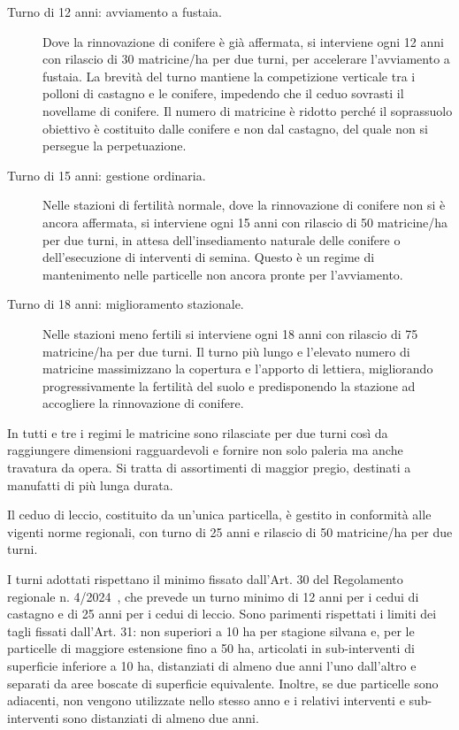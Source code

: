 \begin{description}

\item[Turno di 12 anni: avviamento a fustaia.]

Dove la rinnovazione di conifere è già affermata, si interviene ogni 12 anni con
rilascio di 30 matricine/ha per due turni, per accelerare l'avviamento a
fustaia. La brevità del turno mantiene la competizione verticale tra i polloni
di castagno e le conifere, impedendo che il ceduo sovrasti il novellame di
conifere. Il numero di matricine è ridotto perché il soprassuolo obiettivo è
costituito dalle conifere e non dal castagno, del quale non si persegue la
perpetuazione.

\item[Turno di 15 anni: gestione ordinaria.]

Nelle stazioni di fertilità normale, dove la rinnovazione di conifere non si è
ancora affermata, si interviene ogni 15 anni con rilascio di 50 matricine/ha per
due turni, in attesa dell'insediamento naturale delle conifere o dell'esecuzione
di interventi di semina. Questo è un regime di mantenimento nelle particelle non
ancora pronte per l'avviamento.

\item[Turno di 18 anni: miglioramento stazionale.]

Nelle stazioni meno fertili si interviene ogni 18 anni con rilascio di 75
matricine/ha per due turni. Il turno più lungo e l'elevato numero di matricine
massimizzano la copertura e l'apporto di lettiera, migliorando progressivamente
la fertilità del suolo e predisponendo la stazione ad accogliere la rinnovazione
di conifere.

\end{description}

In tutti e tre i regimi le matricine sono rilasciate per due turni così da
raggiungere dimensioni ragguardevoli e fornire non solo paleria ma anche
travatura da opera. Si tratta di assortimenti di maggior pregio, destinati a
manufatti di più lunga durata.

Il ceduo di leccio, costituito da un'unica particella, è gestito in conformità
alle vigenti norme regionali, con turno di 25 anni e rilascio di 50 matricine/ha
per due turni.

I turni adottati rispettano il minimo fissato dall'Art. 30 del Regolamento
regionale n. 4/2024~\cite{calabria:2024}, che prevede un turno minimo di 12 anni
per i cedui di castagno e di 25 anni per i cedui di leccio. Sono parimenti
rispettati i limiti dei tagli fissati dall'Art. 31: non superiori a 10 ha per
stagione silvana e, per le particelle di maggiore estensione fino a 50 ha,
articolati in sub-interventi di superficie inferiore a 10 ha, distanziati di
almeno due anni l'uno dall'altro e separati da aree boscate di superficie
equivalente. Inoltre, se due particelle sono adiacenti, non vengono utilizzate
nello stesso anno e i relativi interventi e sub-interventi sono distanziati di
almeno due anni.
